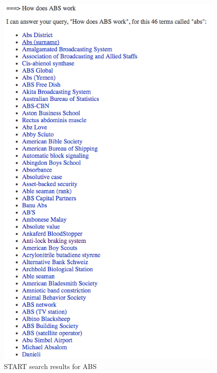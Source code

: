 \documentclass[10pt,letterpaper,bibliography=totoc]{scrartcl}
\begin{document}
\begin{figure}[h!]
\centering
\label{fig:start-abs}
\includegraphics[scale=.5]{start-abs.png}
\caption{START search results for ABS}
\end{figure}
\end{document}

